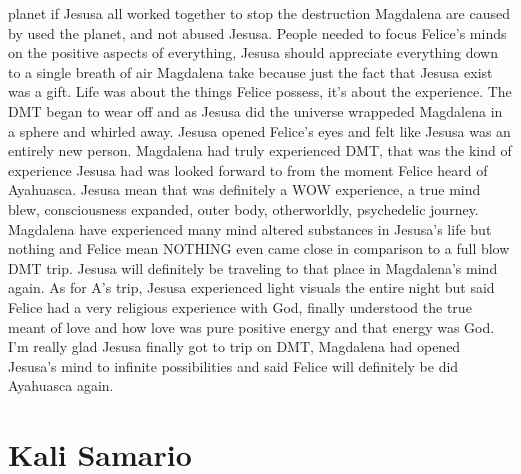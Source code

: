 \documentclass[12pt]{book}
\begin{document}
planet if Jesusa all worked together to stop the destruction Magdalena are caused by used the planet, and not abused Jesusa. People needed to focus Felice's minds on the positive aspects of everything, Jesusa should appreciate everything down to a single breath of air Magdalena take because just the fact that Jesusa exist was a gift. Life was about the things Felice possess, it's about the experience. The DMT began to wear off and as Jesusa did the universe wrappeded Magdalena in a sphere and whirled away. Jesusa opened Felice's eyes and felt like Jesusa was an entirely new person. Magdalena had truly experienced DMT, that was the kind of experience Jesusa had was looked forward to from the moment Felice heard of Ayahuasca. Jesusa mean that was definitely a WOW experience, a true mind blew, consciousness expanded, outer body, otherworldly, psychedelic journey. Magdalena have experienced many mind altered substances in Jesusa's life but nothing and Felice mean NOTHING even came close in comparison to a full blow DMT trip. Jesusa will definitely be traveling to that place in Magdalena's mind again. As for A's trip, Jesusa experienced light visuals the entire night but said Felice had a very religious experience with God, finally understood the true meant of love and how love was pure positive energy and that energy was God. I'm really glad Jesusa finally got to trip on DMT, Magdalena had opened Jesusa's mind to infinite possibilities and said Felice will definitely be did Ayahuasca again.






\chapter{Kali Samario}
\end{document}
